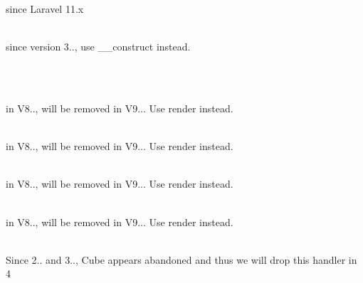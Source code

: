 \begin{DoxyRefList}
\label{deprecated__deprecated000120}%
%
since Laravel 11.\+x  
\item[Global \doxylink{class_cron_1_1_cron_expression_af8d39cdec91ade96507f42610900fa8b}{Cron\+Expression\+::factory} (string \$expression, ?\doxylink{interface_cron_1_1_field_factory_interface}{Field\+Factory\+Interface} \$field\+Factory=null)]\hfill \\
\label{deprecated__deprecated000051}%
%
since version 3.., use \+\_\+\+\_\+construct instead.  
\item[Global \doxylink{class_cron_1_1_cron_expression_a2bac491ba1659b48b536a5485af165b5}{Cron\+Expression\+::YEAR} ]\hfill \\
\label{deprecated__deprecated000050}%
%
  
\item[Global \doxylink{class_sabberworm_1_1_c_s_s_1_1_value_1_1_c_s_s_function_a7516ca30af0db3cdbf9a7739b48ce91d}{CSSFunction\+::\+\_\+\+\_\+to\+String} ()]\hfill \\
\label{deprecated__deprecated000423}%
%
in V8.., will be removed in V9... Use {\ttfamily render} instead.  
\item[Global \doxylink{class_sabberworm_1_1_c_s_s_1_1_c_s_s_list_1_1_c_s_s_list_a7516ca30af0db3cdbf9a7739b48ce91d}{CSSList\+::\+\_\+\+\_\+to\+String} ()]\hfill \\
\label{deprecated__deprecated000382}%
%
in V8.., will be removed in V9... Use {\ttfamily render} instead.  
\item[Global \doxylink{class_sabberworm_1_1_c_s_s_1_1_property_1_1_c_s_s_namespace_a7516ca30af0db3cdbf9a7739b48ce91d}{CSSNamespace\+::\+\_\+\+\_\+to\+String} ()]\hfill \\
\label{deprecated__deprecated000393}%
%
in V8.., will be removed in V9... Use {\ttfamily render} instead.  
\item[Global \doxylink{class_sabberworm_1_1_c_s_s_1_1_value_1_1_c_s_s_string_a7516ca30af0db3cdbf9a7739b48ce91d}{CSSString\+::\+\_\+\+\_\+to\+String} ()]\hfill \\
\label{deprecated__deprecated000424}%
%
in V8.., will be removed in V9... Use {\ttfamily render} instead.  
\item[Class \doxylink{class_monolog_1_1_handler_1_1_cube_handler}{Cube\+Handler} ]\hfill \\
\label{deprecated__deprecated000176}%
%
Since 2.. and 3.., Cube appears abandoned and thus we will drop this handler in  4  
\item[Global \doxylink{class_guzzle_http_1_1_handler_1_1_curl_factory_a74eb6eaaa220e67cc013f30ee9666f34}{Curl\+Factory\+::LOW\+\_\+\+CURL\+\_\+\+VERSION\+\_\+\+NUMBER} ]\hfill \\
\label{deprecated__deprecated000092}%
%
  

\end{DoxyRefList}
